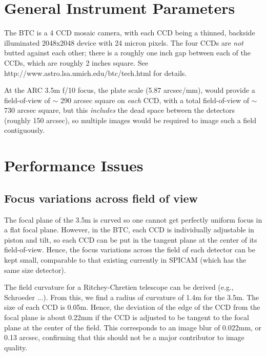 \documentclass{article}
\begin{document}
\section{General Instrument Parameters}

The BTC is a 4 CCD mosaic camera, with each CCD being a thinned, backside
illuminated 2048x2048 device with 24 micron pixels. The four CCDs are 
\textit{not} butted against each other; there is a roughly one inch
gap between each of the CCDs, which are roughly 2 inches square.
See 
{http://www.astro.lsa.umich.edu/btc/tech.html} for details.

At the ARC 3.5m f/10 focus, the plate scale (5.87 arcsec/mm), would
provide a field-of-view of $\sim$ 290 arcsec square on \textit{each}
CCD, with a total field-of-view of $\sim$ 730 arcsec square, but this
\textit{includes} the dead space between the detectors (roughly 150 arcsec),
so multiple images would be required to image such a field contiguously.

\section{Performance Issues}

\subsection{Focus variations across field of view}

The focal plane of the 3.5m is curved so one cannot get perfectly
uniform focus in a flat focal plane. However, in the BTC, each CCD is
individually adjustable in piston and tilt, so each CCD can be put 
in the tangent plane at the center of its field-of-view. Hence, the
focus variations across the field of each detector can be kept 
small, comparable to that existing currently in SPICAM (which has the
same size detector).

The field curvature for a Ritchey-Chretien telescope can be derived
(e.g., Schroeder ...). From this, we find a radius of curvature of
1.4m for the 3.5m. The size of each CCD is 0.05m. Hence, the deviation
of the edge of the CCD from the focal plane is about 0.22mm if the
CCD is adjusted to be tangent to the focal plane at the center of the
field. This corresponds to an image blur of 0.022mm, or 0.13 arcsec,
confirming that this should not be a major contributor to image quality.

\end{document}
